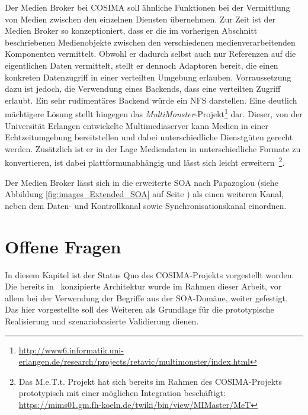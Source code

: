   Der Medien Broker bei COSIMA soll ähnliche Funktionen bei der Vermittlung von Medien zwischen den einzelnen Diensten übernehmen. Zur Zeit ist der Medien Broker so konzeptioniert, dass er die im vorherigen Abschnitt beschriebenen Medienobjekte zwischen den verschiedenen medienverarbeitenden Komponenten vermittelt. Obwohl er dadurch selbst auch nur Referenzen auf die eigentlichen Daten vermittelt, stellt er dennoch Adaptoren bereit, die einen konkreten Datenzugriff in einer verteilten Umgebung erlauben. Vorraussetzung dazu ist jedoch, die Verwendung eines Backends, dass eine verteilten Zugriff erlaubt. Ein sehr rudimentäres Backend würde ein NFS darstellen. Eine deutlich mächtigere Lösung stellt hingegen das \emph{MultiMonster}-Projekt\footnote{\url{http://www6.informatik.uni-erlangen.de/research/projects/retavic/multimonster/index.html}} dar. Dieser, von der Universität Erlangen entwickelte Multimediaserver kann Medien in einer Echtzeitumgebung bereitstellen und dabei unterschiedliche Dienstgüten gerecht werden. Zusätzlich ist er in der Lage Mediendaten in unterschiedliche Formate zu konvertieren, ist dabei plattformunabhängig und lässt sich leicht erweitern~\citep{suchomski2004oar}\footnote{Das M.e.T.t. Projekt hat sich bereits im Rahmen des COSIMA-Projekts prototypisch mit einer möglichen Integration beschäftigt: \url{https://mims01.gm.fh-koeln.de/twiki/bin/view/MIMaster/MeT}}.
  
  Der Medien Broker lässt sich in die erweiterte SOA nach Papazoglou (siehe Abbildung \ref{fig:images_Extended_SOA} auf Seite \pageref{fig:images_Extended_SOA}) als einen weiteren Kanal, neben dem Daten- und Kontrollkanal sowie Synchronisationskanal einordnen.
  


\section{Offene Fragen} %
\label{sec:offene_fragen}

  In diesem Kapitel ist der Status Quo des COSIMA-Projekts vorgestellt worden. Die bereits in~\citep{bericht} konzipierte Architektur wurde im Rahmen dieser Arbeit, vor allem bei der Verwendung der Begriffe aus der SOA-Domäne, weiter gefestigt. Das hier vorgestellte soll des Weiteren als Grundlage für die prototypische Realisierung und szenariobasierte Validierung dienen.

